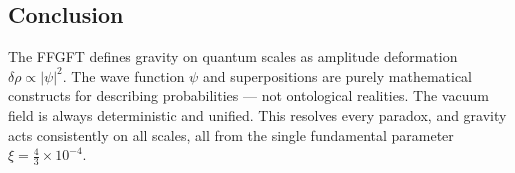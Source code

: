 	\subsection*{Conclusion}
	
	The FFGFT defines gravity on quantum scales as amplitude deformation \(\delta \rho \propto |\psi|^2\). The wave function \(\psi\) and superpositions are purely mathematical constructs for describing probabilities — not ontological realities. The vacuum field is always deterministic and unified. This resolves every paradox, and gravity acts consistently on all scales, all from the single fundamental parameter \(\xi = \frac{4}{3} \times 10^{-4}\).



